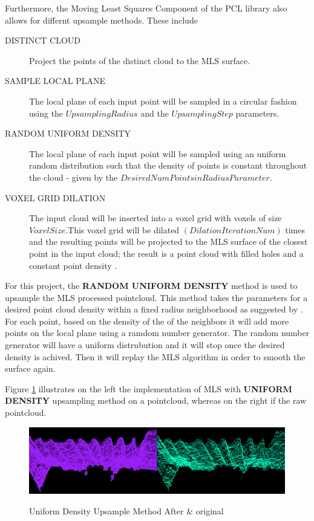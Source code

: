 \documentclass[12pt]{report}
\begin{document}
Furthermore, the Moving Least Squares Component of the PCL library also allows for differnt upsample methods. 
These include 
\begin{description}
  \item[DISTINCT CLOUD] Project the points of the distinct cloud to the MLS surface\cite[]{Rusu_ICRA2011_PCL}.
  \item[SAMPLE LOCAL PLANE] The local plane of each input point will be sampled in a circular fashion using the $UpsamplingRadius$  and the $UpsamplingStep$ parameters\cite[]{Rusu_ICRA2011_PCL}. 
  \item[RANDOM UNIFORM DENSITY] The local plane of each input point will be sampled using an uniform random distribution such that the density of points is constant throughout the cloud - given by the $Desired Num Points in Radius Parameter$\cite[]{Rusu_ICRA2011_PCL}. 
  \item[VOXEL GRID DILATION] The input cloud will be inserted into a voxel grid with voxels of size $Voxel Size$.This voxel grid will be dilated $(Dilation Iteration Num)$ times and the resulting points will be projected to the MLS surface of the closest point in the input cloud; the result is a point cloud with filled holes and a constant point density \cite[]{Rusu_ICRA2011_PCL}.
\end{description}

For this project,  the \textbf {RANDOM UNIFORM DENSITY} method is used to upsample the MLS processed pointcloud. 
This method takes the parameters for a desired point cloud density within a fixed radius neighborhood as suggested by . 
For each point, based on the density of the of the neighbors it will add more points on the local plane using a ramdom  number generator.
The random number generator will have a uniform distrubution and it will stop once the desired density is achived. Then it will replay the MLS algorithm in order to smooth the surface again.

Figure \ref{fig:sUpsample_def} illustrates on the left the implementation of MLS with \textbf{UNIFORM DENSITY} upsampling method on a pointcloud, whereas on the right  if the raw pointcloud.

\begin{figure}[H]%
  \centering
  \includegraphics[width=1\textwidth]{upsample_def.png}
 \caption{Uniform Density Upsample Method After \& original}\cite[]{ichim_2012}
 \label{fig:sUpsample_def} 
\end{figure}
\end{document}
